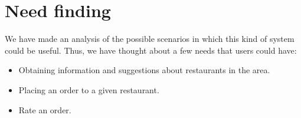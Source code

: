 \section{Need finding}
We have made an analysis of the possible scenarios in which this kind
of system could be useful. Thus, we have thought about a few needs
that users could have:

\begin{itemize}
    \item Obtaining information and suggestions about restaurants in the area.
    \item Placing an order to a given restaurant. 
    \item Rate an order.
\end{itemize}